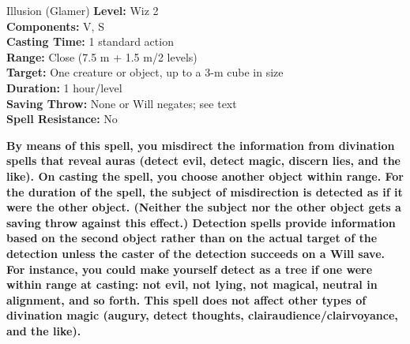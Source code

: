 {Illusion (Glamer)}
{
	\textbf{Level:}
	Wiz 2\\
	\textbf{Components:}
	V, S\\
	\textbf{Casting Time:}
	1 standard action\\
	\textbf{Range:}
	Close (7.5 m + 1.5 m/2 levels)\\
	\textbf{Target:}
	One creature or object, up to a 3-m cube in size\\
	\textbf{Duration:}
	1 hour/level\\
	\textbf{Saving Throw:}
	None or Will negates; see text\\
	\textbf{Spell Resistance:}
	No\\
}
{
	\textbf{	By means of this spell, you misdirect the information from divination spells that reveal auras (detect evil, detect magic, discern lies, and the like). On casting the spell, you choose another object within range. For the duration of the spell, the subject of misdirection is detected as if it were the other object. (Neither the subject nor the other object gets a saving throw against this effect.) Detection spells provide information based on the second object rather than on the actual target of the detection unless the caster of the detection succeeds on a Will save. For instance, you could make yourself detect as a tree if one were within range at casting: not evil, not lying, not magical, neutral in alignment, and so forth. This spell does not affect other types of divination magic (augury, detect thoughts, clairaudience/clairvoyance, and the like).}

}
